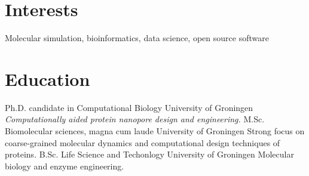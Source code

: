 \documentclass[letterpaper]{twentysecondcv} %
\begin{document}









\makeprofile %


\section{Interests}

Molecular simulation, bioinformatics, data science, open source software


\section{Education}

\begin{twenty} %
		{Ph.D. {\normalfont candidate in Computational Biology}}
		{University of Groningen}
		{\emph{Computationally aided protein nanopore design and engineering.}}
		{M.Sc. Biomolecular sciences, magna cum laude}
		{University of Groningen}
		{Strong focus on coarse-grained molecular dynamics and computational design techniques of proteins.}
		{B.Sc. Life Science and Techonlogy}
		{University of Groningen}
		{Molecular biology and enzyme engineering.}
\end{twenty}
\end{document}
